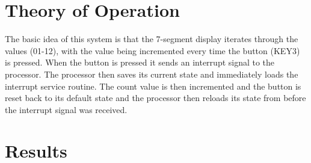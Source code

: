 \documentclass[10pt,a4paper]{article}
\begin{document}
	\section{Theory of Operation}
	The basic idea of this system is that the 7-segment display iterates through the values (01-12), with the value being incremented every time the button (KEY3) is pressed. When the button is pressed it sends an interrupt signal to the processor. The processor then saves its current state and immediately loads the interrupt service routine. The count value is then incremented and the button is reset back to its default state and the processor then reloads its state from before the interrupt signal was received.
	
	\section{Results}
\end{document}
